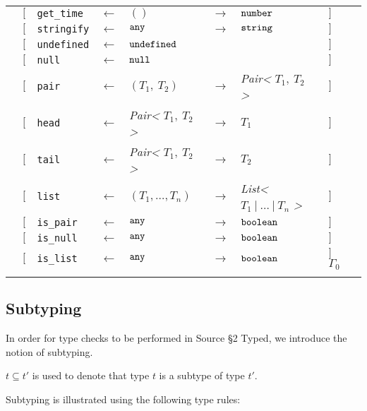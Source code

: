 \begin{tabular}[fragile]{lllllllll}
& $[$ & \texttt{get\_time} & $\leftarrow$  & $()$ & $\rightarrow$ & $\texttt{number}$ & $]$ \\
& $[$ & \texttt{stringify} & $\leftarrow$  & $\texttt{any}$ & $\rightarrow$ & $\texttt{string}$ & $]$ \\
& $[$ & \texttt{undefined} & $\leftarrow$  & $\texttt{undefined}$ & & & $]$ \\
& $[$ & \texttt{null}      & $\leftarrow$  & $\texttt{null}$ & & & $]$ \\
& $[$ & \texttt{pair} & $\leftarrow$  & $(T_1,\ T_2)$ & $\rightarrow$ & \textit{Pair<} $T_1,\ T_2$ \textit{>} & $]$ \\
& $[$ & \texttt{head} & $\leftarrow$  & \textit{Pair<} $T_1,\ T_2$ \textit{>} & $\rightarrow$ & $T_1$ & $]$ \\
& $[$ & \texttt{tail} & $\leftarrow$  & \textit{Pair<} $T_1,\ T_2$ \textit{>} & $\rightarrow$ & $T_2$ & $]$ \\
& $[$ & \texttt{list} & $\leftarrow$  & $(T_1, \ldots, T_n)$ & $\rightarrow$ & \textit{List<} $T_1\ |\ \ldots\ |\ T_n$ \textit{>} & $]$ \\
& $[$ & \texttt{is\_pair} & $\leftarrow$  & $\texttt{any}$ & $\rightarrow$ & $\texttt{boolean}$ & $]$ \\
& $[$ & \texttt{is\_null} & $\leftarrow$  & $\texttt{any}$ & $\rightarrow$ & $\texttt{boolean}$ & $]$ \\
& $[$ & \texttt{is\_list} & $\leftarrow$  & $\texttt{any}$ & $\rightarrow$ & $\texttt{boolean}$ & $]$ $\Gamma_0$ \\
& \end{tabular}

\subsection{Subtyping}

In order for type checks to be performed in Source \S 2 Typed, we introduce the notion of subtyping.

\begin{definition}
$t \subseteq t'$ is used to denote that type $t$ is a subtype of type $t'$.
\end{definition}

Subtyping is illustrated using the following type rules:

